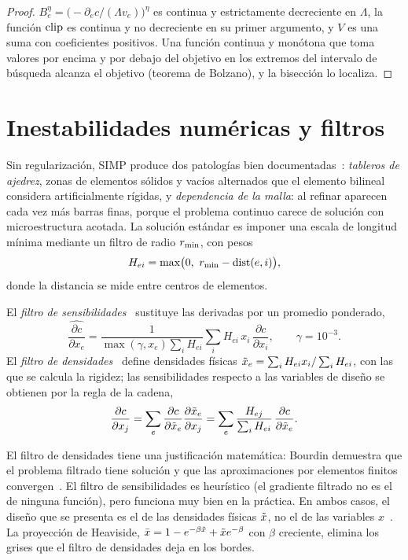 \begin{proof}
$B_e^\eta=\bigl(-\partial_ec/(\Lambda v_e)\bigr)^{\eta}$ es continua y estrictamente decreciente en $\Lambda$, la función $\operatorname{clip}$ es continua y no decreciente en su primer argumento, y $V$ es una suma con coeficientes positivos. Una función continua y monótona que toma valores por encima y por debajo del objetivo en los extremos del intervalo de búsqueda alcanza el objetivo (teorema de Bolzano), y la bisección lo localiza.
\end{proof}

\section{Inestabilidades numéricas y filtros}

Sin regularización, SIMP produce dos patologías bien documentadas~\cite{sigpet}: \emph{tableros de ajedrez}, zonas de elementos sólidos y vacíos alternados que el elemento bilineal considera artificialmente rígidas, y \emph{dependencia de la malla}: al refinar aparecen cada vez más barras finas, porque el problema continuo carece de solución con microestructura acotada. La solución estándar es imponer una escala de longitud mínima mediante un filtro de radio $r_{\min}$, con pesos
\[
H_{ei}=\max\bigl(0,\ \rmin-\operatorname{dist}(e,i)\bigr),
\]
donde la distancia se mide entre centros de elementos.

\begin{definicion}\label{def:filtros}
El \emph{filtro de sensibilidades}~\cite{sigmund99,andreassen} sustituye las derivadas por un promedio ponderado,
\[
\widehat{\frac{\partial c}{\partial x_e}}=\frac{1}{\max(\gamma,x_e)\sum_iH_{ei}}\sum_iH_{ei}\,x_i\,\frac{\partial c}{\partial x_i},\qquad \gamma=10^{-3}.
\]
El \emph{filtro de densidades}~\cite{bourdin} define densidades físicas $\tilde{x}_e=\sum_iH_{ei}x_i/\sum_iH_{ei}$, con las que se calcula la rigidez; las sensibilidades respecto a las variables de diseño se obtienen por la regla de la cadena,
\[
\frac{\partial c}{\partial x_j}=\sum_e\frac{\partial c}{\partial\tilde{x}_e}\frac{\partial\tilde{x}_e}{\partial x_j}=\sum_e\frac{H_{ej}}{\sum_iH_{ei}}\,\frac{\partial c}{\partial\tilde{x}_e}.
\]
\end{definicion}

El filtro de densidades tiene una justificación matemática: Bourdin demuestra que el problema filtrado tiene solución y que las aproximaciones por elementos finitos convergen~\cite{bourdin}. El filtro de sensibilidades es heurístico (el gradiente filtrado no es el de ninguna función), pero funciona muy bien en la práctica. En ambos casos, el diseño que se presenta es el de las densidades físicas $\tilde{x}$, no el de las variables $x$~\cite[§2.3]{andreassen}. La proyección de Heaviside, $\bar x=1-e^{-\beta\tilde{x}}+\tilde{x} e^{-\beta}$ con $\beta$ creciente, elimina los grises que el filtro de densidades deja en los bordes.

